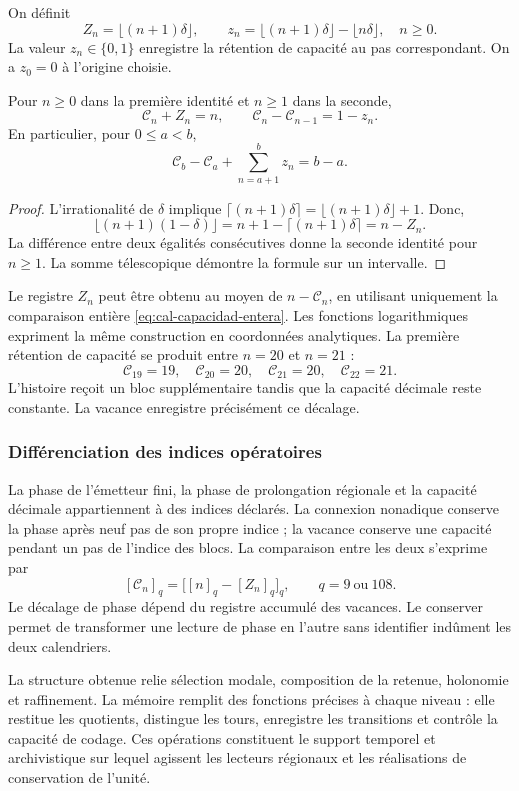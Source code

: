 \begin{definicion}
On définit
\[
 Z_n=\lfloor(n+1)\delta\rfloor,\qquad
 z_n=\lfloor(n+1)\delta\rfloor-\lfloor n\delta\rfloor,
 \quad n\geq0.
\]
La valeur $z_n\in\{0,1\}$ enregistre la rétention de capacité au
pas correspondant. On a $z_0=0$ à l’origine choisie.
\end{definicion}

\begin{teorema}
\label{thm:cal-capacidad}
Pour $n\geq0$ dans la première identité et $n\geq1$ dans la seconde,
\begin{equation}
 \mathcal C_n+Z_n=n,
 \qquad \mathcal C_n-\mathcal C_{n-1}=1-z_n.
 \label{eq:cal-capacidad}
\end{equation}
En particulier, pour $0\leq a<b$,
\[
 \mathcal C_b-\mathcal C_a+\sum_{n=a+1}^{b}z_n=b-a.
\]
\end{teorema}
\begin{proof}
L’irrationalité de $\delta$ implique
$\lceil(n+1)\delta\rceil=\lfloor(n+1)\delta\rfloor+1$.
Donc,
\[
 \lfloor(n+1)(1-\delta)\rfloor
 =n+1-\lceil(n+1)\delta\rceil=n-Z_n.
\]
La différence entre deux égalités consécutives donne la seconde identité
pour $n\geq1$. La somme télescopique démontre la formule sur un intervalle.
\end{proof}

Le registre $Z_n$ peut être obtenu au moyen de $n-\mathcal C_n$,
en utilisant uniquement la comparaison entière
\eqref{eq:cal-capacidad-entera}. Les fonctions logarithmiques expriment
la même construction en coordonnées analytiques. La première rétention
de capacité se produit entre $n=20$ et $n=21$ :
\[
 \mathcal C_{19}=19,\quad\mathcal C_{20}=20,\quad
 \mathcal C_{21}=20,\quad\mathcal C_{22}=21.
\]
L’histoire reçoit un bloc supplémentaire tandis que la capacité décimale
reste constante. La vacance enregistre précisément ce décalage.

\subsubsection{Différenciation des indices opératoires}

La phase de l’émetteur fini, la phase de prolongation régionale et la capacité
décimale appartiennent à des indices déclarés. La connexion nonadique conserve
la phase après neuf pas de son propre indice ; la vacance conserve une
capacité pendant un pas de l’indice des blocs. La comparaison entre
les deux s’exprime par
\[
 [\mathcal C_n]_q=\bigl[[n]_q-[Z_n]_q\bigr]_q,
 \qquad q=9\ \text{ou}\ 108.
\]
Le décalage de phase dépend du registre accumulé des vacances. Le conserver
permet de transformer une lecture de phase en l’autre sans identifier
indûment les deux calendriers.

La structure obtenue relie sélection modale, composition de la retenue,
holonomie et raffinement. La mémoire remplit des fonctions précises à chaque
niveau : elle restitue les quotients, distingue les tours, enregistre les transitions et
contrôle la capacité de codage. Ces opérations constituent le
support temporel et archivistique sur lequel agissent les lecteurs régionaux
et les réalisations de conservation de l’unité.

